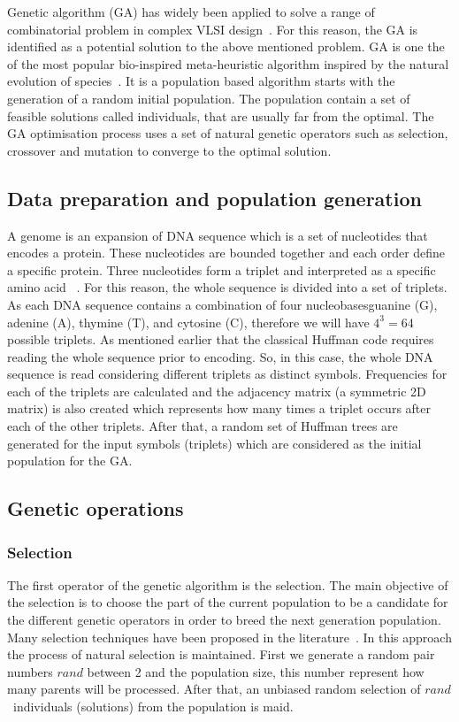 \documentclass[preprint,12pt]{elsarticle}
\begin{document}
Genetic algorithm (GA) has widely been applied to solve a range of combinatorial problem in complex VLSI design~\cite{chan1991macro,bright1996genetic,cohoon1987genetic}. For this reason, the GA is identified as a potential solution to the above mentioned problem. GA is one the of the most popular bio-inspired meta-heuristic algorithm inspired by the natural evolution of species~\cite{gen1}. It is a population based algorithm starts with the generation of a random initial population. The population contain a set of feasible solutions called individuals, that are usually far from the optimal. The GA optimisation process uses a set of natural genetic operators such as selection, crossover and mutation to converge to the optimal solution.
\subsection{ Data preparation and population generation}
A genome is an expansion of DNA sequence which is a set of nucleotides that encodes a protein. These nucleotides are bounded together and each order define a specific protein. Three nucleotides form a triplet and interpreted as a specific amino acid ~\cite{Harvey00}. For this reason, the whole sequence is divided into a set of triplets.  As each DNA sequence contains a combination of four nucleobases\textemdash guanine (G), adenine (A), thymine (T), and cytosine (C), therefore we will have $4^3=64$ possible triplets. As mentioned earlier that the classical Huffman code requires reading the whole sequence prior to encoding. So, in this case, the whole DNA sequence is read considering different triplets as distinct symbols. Frequencies for each of the triplets are calculated and  the adjacency matrix (a symmetric 2D matrix) is also created which represents how many times a triplet occurs after each of the other triplets.  After that, a random set of Huffman trees are generated for the input symbols (triplets) which are considered as the initial population for the GA.
 \subsection{Genetic operations}
\subsubsection{Selection}
The first operator of the genetic algorithm is the selection. The main objective of the selection is to choose the part of the current  population to be a candidate for the different genetic operators in order to breed the next generation population. Many selection techniques have been proposed in the literature~\cite{bli95}. In this approach the  process of natural selection is maintained. First we generate a random pair numbers \textit{$rand$} between 2 and the population size, this number represent how many parents will be processed. After that, an unbiased random selection of \textit{$rand$}~individuals (solutions) from the population is maid. 
\end{document}

